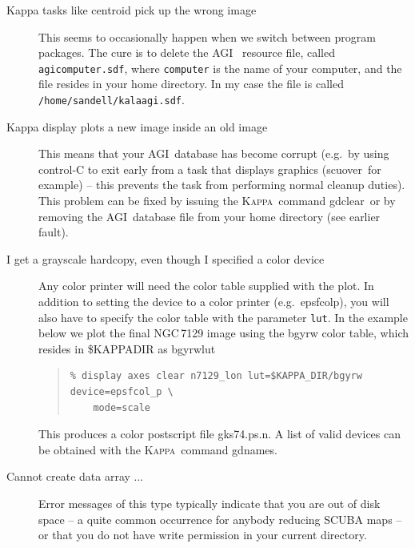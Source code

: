 \documentclass[twoside,11pt]{article}
\newenvironment{myquote}{\begin{quote}\begin{small}}{\end{small}\end{quote}}
\newcommand{\Kappa}{\xref{\textsc{Kappa}}{sun95}{}}
\newcommand{\agi}{\xref{AGI}{sun48}{}}
\newcommand{\task}[1]{\textsf{#1}}
\newcommand{\param}[1]{\texttt{#1}}
\newcommand{\scuover}{\xref{\task{scuover}}{sun216}{SCUOVER}}
\newcommand{\gdnames}{\xref{\task{gdnames}}{sun95}{GDNAMES}}
\newcommand{\gdclear}{\xref{\task{gdclear}}{sun95}{GDCLEAR}}
\newcommand{\xref}[3]{#1}
\renewcommand{\_}{\texttt{\symbol{95}}}
\begin{document}
\begin{description}
\item[Kappa tasks like \task{centroid} pick up the wrong image]\mbox{}

This seems to occasionally happen when we switch between program
packages. The cure is to delete the \agi\ \cite{agi} resource file,
called \texttt{agi\_computer.sdf}, where \texttt{computer} is the name
of your computer, and the file resides in your home directory. In my
case the file is called \texttt{/home/sandell/kala\_agi.sdf}.

\item[Kappa \task{display} plots a new image inside an old 
image]\mbox{}

This means that your \agi\ database has become corrupt (e.g.\ by using
control-C to exit early from a task that displays graphics (\scuover\ 
for
example) -- this prevents the task from performing normal cleanup
duties). This problem can be fixed by issuing the \Kappa\ command 
\gdclear\ or
by removing the \agi\ database file from your home directory (see 
earlier
fault).

\item[I get a grayscale hardcopy, even though I specified a color 
device]\mbox{}

Any color printer will need the color table supplied with the plot. In
addition to setting the device to a color printer (e.g.\ epsfcol\_p), 
you will
also have to specify the color table with the parameter \param{lut}.  
In the
example below we plot the final NGC\,7129 image using the bgyrw color 
table,
which resides in \$KAPPA\_DIR as bgyrw\_lut

\begin{myquote} \begin{verbatim}
% display axes clear n7129_lon lut=$KAPPA_DIR/bgyrw device=epsfcol_p \
    mode=scale
\end{verbatim} \end{myquote}

This produces a color postscript file gks74.ps.n. A list of valid 
devices
can be obtained with the \Kappa\ command \gdnames.


\item[Cannot create data array ...]\mbox{}

Error messages of this type typically indicate that you are out of
disk space -- a quite common occurrence for anybody reducing SCUBA 
maps --
or that you do not have write permission in your current directory.

\end{description}
\end{document}
